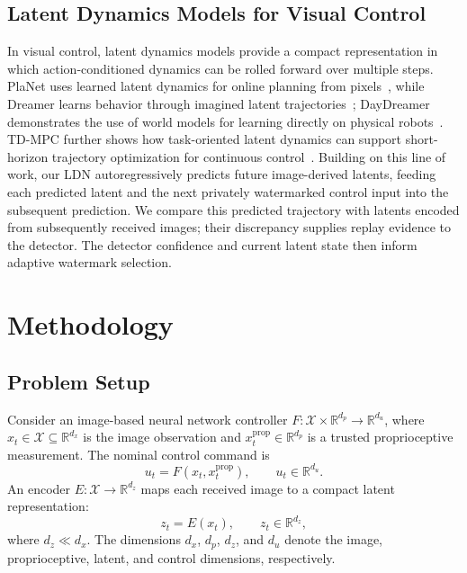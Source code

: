 \documentclass[letterpaper, 10 pt, conference]{ieeeconf}
\theoremstyle{plain}
\begin{document}
\subsection{Latent Dynamics Models for Visual Control}

In visual control, latent dynamics models provide a compact representation in which action-conditioned dynamics can be rolled forward over multiple steps. PlaNet uses learned latent dynamics for online planning from pixels~\cite{hafner2019planet}, while Dreamer learns behavior through imagined latent trajectories~\cite{hafner2020dreamer}; DayDreamer demonstrates the use of world models for learning directly on physical robots~\cite{wu2023daydreamer}. TD-MPC further shows how task-oriented latent dynamics can support short-horizon trajectory optimization for continuous control~\cite{hansen2022tdmpc}. Building on this line of work, our LDN autoregressively predicts future image-derived latents, feeding each predicted latent and the next privately watermarked control input into the subsequent prediction. We compare this predicted trajectory with latents encoded from subsequently received images; their discrepancy supplies replay evidence to the detector. The detector confidence and current latent state then inform adaptive watermark selection.

\section{Methodology}

\subsection{Problem Setup}
Consider an image-based neural network controller $F:\mathcal{X}\times\mathbb{R}^{d_p}\to\mathbb{R}^{d_u}$, where $x_t\in\mathcal{X}\subseteq\mathbb{R}^{d_x}$ is the image observation and $x_t^{\mathrm{prop}}\in\mathbb{R}^{d_p}$ is a trusted proprioceptive measurement. The nominal control command is
\begin{equation}
    u_t = F(x_t,x_t^{\mathrm{prop}}), \qquad u_t\in\mathbb{R}^{d_u}.
\end{equation}
An encoder $E:\mathcal{X}\to\mathbb{R}^{d_z}$ maps each received image to a compact latent representation:
\begin{equation}
    z_t = E(x_t), \qquad z_t \in \mathbb{R}^{d_z},
\end{equation}
where $d_z\ll d_x$. The dimensions $d_x$, $d_p$, $d_z$, and $d_u$ denote the image, proprioceptive, latent, and control dimensions, respectively.
\end{document}
